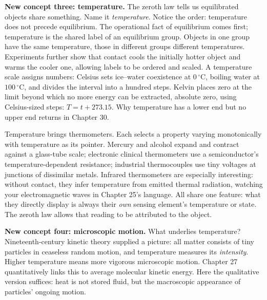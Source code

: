 \begin{mainline}
\textbf{New concept three: temperature.} The zeroth law tells us equilibrated objects share something. Name it \emph{temperature}. Notice the order: temperature does not precede equilibrium. The operational fact of equilibrium comes first; temperature is the shared label of an equilibrium group. Objects in one group have the same temperature, those in different groups different temperatures. Experiments further show that contact cools the initially hotter object and warms the cooler one, allowing labels to be ordered and scaled. A temperature scale assigns numbers: Celsius sets ice--water coexistence at \(0\,^\circ\mathrm{C}\), boiling water at \(100\,^\circ\mathrm{C}\), and divides the interval into a hundred steps. Kelvin places zero at the limit beyond which no more energy can be extracted, absolute zero, using Celsius-sized steps: \(T = t + 273.15\). Why temperature has a lower end but no upper end returns in Chapter 30.

Temperature brings thermometers. Each selects a property varying monotonically with temperature as its pointer. Mercury and alcohol expand and contract against a glass-tube scale; electronic clinical thermometers use a semiconductor's temperature-dependent resistance; industrial thermocouples use tiny voltages at junctions of dissimilar metals. Infrared thermometers are especially interesting: without contact, they infer temperature from emitted thermal radiation, watching your electromagnetic waves in Chapter 25's language. All share one feature: what they directly display is always their \emph{own} sensing element's temperature or state. The zeroth law allows that reading to be attributed to the object.

\textbf{New concept four: microscopic motion.} What underlies temperature? Nineteenth-century kinetic theory supplied a picture: all matter consists of tiny particles in ceaseless random motion, and temperature measures its \emph{intensity}. Higher temperature means more vigorous microscopic motion. Chapter 27 quantitatively links this to average molecular kinetic energy. Here the qualitative version suffices: heat is not stored fluid, but the macroscopic appearance of particles' ongoing motion.


\end{mainline}
